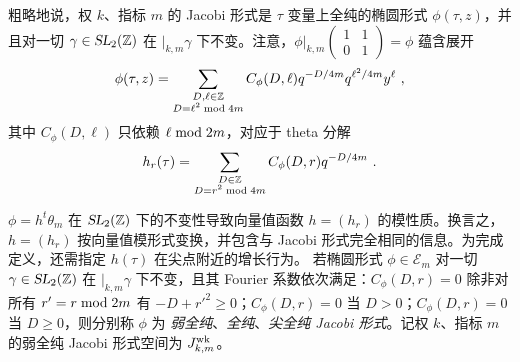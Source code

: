\documentclass[11pt,a4paper,fontset=windows]{ctexart}
\numberwithin{equation}{section}
\newcommand{\SL}{\operatorname{\textsl{SL}}}      %
\newcommand{\wk}{{\rm wk}}
\newcommand{\ZZ}{\mathbb{Z}}
\newcommand{\E}{\mathcal{E}}
\newcommand{\xmod}{{\rm \;mod\;}}
\def\f{\phi}
\def\t{\tau}
\def\D{\Delta}
\newcommand{\ex}{\operatorname{e}} %
\begin{document}

粗略地说，权 $k$、指标 $m$ 的 Jacobi 形式是 $\t$ 变量上全纯的椭圆形式 $\phi(\t,z)$，并且对一切 $\gamma\in\SL_2(\ZZ)$ 在 $\lvert_{k,m} \gamma$ 下不变。注意，${\phi|_{k,m}\left(\begin{smallmatrix}1&1\\0&1\end{smallmatrix}\right)=\phi}$ 蕴含展开
\begin{gather}\label{eqn:jac:hol-DFoucffhol}
\f(\t,z) = \sum_{\substack{D,\ell  \in \ZZ\\D=\ell ^2\xmod 4m}} C_\f(D,\ell ) q^{-D/4m}q^{\ell ^2/4m} y^\ell~,
\end{gather}
其中 $C_\f(D,\ell ) $ 只依赖 $\ell \xmod 2m$，对应于 theta 分解
\begin{gather}\label{eqn:jac:hol-thtcoeffFoucoeff}
h_r(\tau)=\sum_{\substack{D\in\ZZ\\D=r^2\xmod 4m}}C_\phi(D,r)q^{-D/4m}~.
\end{gather}


$\phi=h^t\theta_m$ 在 $\SL_2(\ZZ)$ 下的不变性导致向量值函数 $h=(h_r)$ 的模性质。换言之，$h=(h_r)$ 按向量值模形式变换，并包含与 Jacobi 形式完全相同的信息。为完成定义，还需指定 $h(\t)$ 在尖点附近的增长行为。
若椭圆形式 $\phi\in\E_m$ 对一切 $\gamma\in\SL_2(\ZZ)$ 在 $\lvert_{k,m} \gamma$ 下不变，且其 Fourier 系数依次满足：$C_\f(D,r)=0$ 除非对所有 $r'=r \xmod{2m}$ 有 $-D+ r'^{2}\geq 0$；$C_\f(D,r)=0$ 当 $D > 0$；$C_{\f}(D,r)=0$ 当 $D \ge0$，则分别称 $\phi$ 为 {\it 弱全纯}、{\it 全纯}、{\it 尖全纯 Jacobi 形式}。记权 $k$、指标 $m$ 的弱全纯 Jacobi 形式空间为 $J^\wk_{k,m}$。

\end{document}
